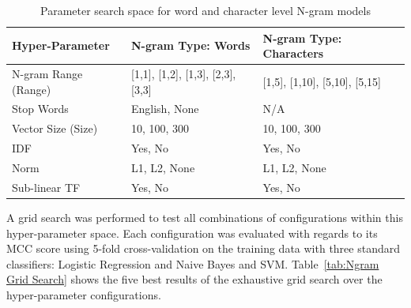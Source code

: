 \begin{table}[h]
  \begin{center}
  \begin{tabular}{ l l l}
    \toprule
    Hyper-Parameter & N-gram Type: Words & N-gram Type: Characters \\
    \midrule
    N-gram Range (Range) & [1,1], [1,2], [1,3], [2,3], [3,3] & [1,5], [1,10], [5,10], [5,15] \\
    Stop Words & English, None & N/A \\
    Vector Size (Size) & 10, 100, 300 & 10, 100, 300 \\
    IDF & Yes, No & Yes, No \\
    Norm & L1, L2, None & L1, L2, None \\
    Sub-linear TF & Yes, No & Yes, No \\
    \bottomrule
  \end{tabular}
  \caption{Parameter search space for word and character level N-gram models}
\label{tab:N-gram Hyper-parameters Space}
\end{center}
\end{table}

A grid search was performed to test all combinations of configurations within this hyper-parameter space. Each configuration was evaluated with regards to its \gls{MCC} score using 5-fold cross-validation on the training data with three standard classifiers: Logistic Regression and Naive Bayes and SVM.
Table~\ref{tab:Ngram Grid Search} shows the five best results of the exhaustive grid search over the hyper-parameter configurations.

